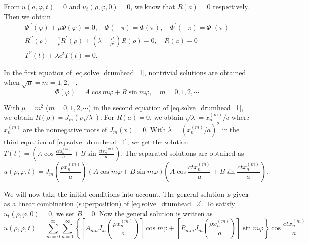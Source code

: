 From $u(a, \varphi, t)=0$ and $u_t(\rho, \varphi, 0)=0$, we know that $R(a) = 0$ respectively. Then we obtain
\begin{equation}\label{eq.solve_drumhead_1}
\begin{array}{l}
    \Phi^{\prime \prime}(\varphi)+\mu \Phi(\varphi)=0, \quad \Phi(-\pi)=\Phi(\pi), \quad \Phi^{\prime}(-\pi)=\Phi^{\prime}(\pi) \\
    R^{\prime \prime}(\rho)+\frac{1}{\rho} R^{\prime}(\rho)+\left(\lambda-\frac{\mu}{\rho^2}\right) R(\rho)=0, \quad R(a)=0 \\
    T^{\prime \prime}(t)+\lambda c^2 T(t)=0.
\end{array}
\end{equation}


In the first equation of \eqref{eq.solve_drumhead_1}, nontrivial solutions are obtained when $\sqrt{\mu} = m = 1,2, \cdots$,
$$
\Phi(\varphi)=A \cos m \varphi+B \sin m \varphi, \quad m=0,1,2, \cdots
$$


With $\mu=m^2$ ($m=0,1,2, \cdots$) in the second equation of \eqref{eq.solve_drumhead_1}, we obtain $R(\rho)=J_m(\rho \sqrt{\lambda})$. For $R(a)=0$, we obtain $\sqrt{\lambda}=x_n^{(m)} / a$ where $x_n^{(m)}$ are the nonnegative roots of $J_m(x)=0$. With $\lambda = \left(x_n^{(m)} / a\right)^2$ in the third equation of \eqref{eq.solve_drumhead_1}, we get the solution $T(t) = \left(\bar{A} \cos \frac{c t x_n^{(m)}}{a}+\bar{B} \sin \frac{c t x_n^{(m)}}{a}\right)$. The separated solutions are obtained as
\begin{equation}\label{eq.solve_drumhead_2}
    u(\rho, \varphi, t)=J_m\left(\frac{\rho x_n^{(m)}}{a}\right)(A \cos m \varphi+B \sin m \varphi)\left(\bar{A} \cos \frac{c t x_n^{(m)}}{a}+\bar{B} \sin \frac{c t x_n^{(m)}}{a}\right) .
\end{equation}


We will now take the initial conditions into account. The general solution is given as a linear combination (superposition) of \eqref{eq.solve_drumhead_2}. To satisfy $u_t(\rho, \varphi, 0)=0$, we set $\bar{B}_{}=0$. Now the general solution is written as
\begin{equation}\label{eq.solve_drumhead_3}
    u(\rho, \varphi, t)=\sum_{m=0}^{\infty} \sum_{n=1}^{\infty}\left\{\left[A_{m n} J_m\left(\frac{\rho x_n^{(m)}}{a}\right)\right] \cos m \varphi+\left[B_{m m} J_m\left(\frac{\rho x_n^{(m)}}{a}\right)\right] \sin m \varphi\right\} \cos \frac{c t x_n^{(m)}}{a}
\end{equation}

